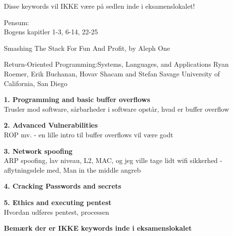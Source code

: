 \documentclass[Screen16to9,17pt]{foils}
\begin{document}
Disse keywords vil IKKE være på sedlen inde i eksamenslokalet!

Pensum:\\
Bogens kapitler 1-3, 6-14, 22-25

Smashing The Stack For Fun And Profit, by Aleph One

Return-Oriented Programming:Systems, Languages, and Applications
Ryan Roemer, Erik Buchanan, Hovav Shacam and Stefan Savage University of California, San Diego


\begin{list2}
\item {\bf 1. Programming and basic buffer overflows}\\
Trusler mod software, sårbarheder i software opstår, hvad er buffer overflow

\item {\bf 2. Advanced Vulnerabilities}\\
ROP mv. - en lille intro til buffer overflows vil være godt

\item {\bf 3. Network spoofing}\\
ARP spoofing, lav niveau, L2, MAC, og jeg ville tage lidt wifi sikkerhed - aflytningsdele med, Man in the middle angreb

\item {\bf 4. Cracking Passwords and secrets}\\

\item {\bf 5. Ethics and executing pentest}\\
Hvordan udføres pentest, processen
\end{list2}

\centerline{\bf Bemærk der er IKKE keywords inde i eksamenslokalet}

\end{document}
